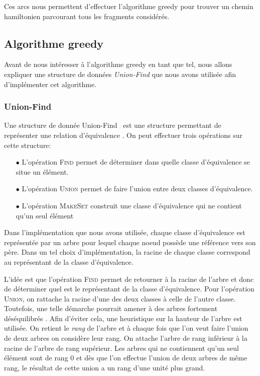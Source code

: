 Ces arcs nous permettent d'effectuer l'algorithme greedy pour trouver un chemin hamiltonien parcourant tous les fragments considérés.


\subsection{Algorithme greedy}
\label{subsection:greedy}

Avant de nous intéresser à l'algorithme greedy en tant que tel, nous allons expliquer une structure de données \emph{Union-Find} que nous avons utilisée afin d'implémenter cet algorithme.

\subsubsection{Union-Find}

Une structure de donnée \og Union-Find \fg~est une structure permettant de représenter une relation d'équivalence . On peut effectuer trois opérations sur cette structure:
\begin{itemize}
\item[$\bullet$] L'opération \textsc{Find} permet de déterminer dans quelle classe d'équivalence se situe un élément.
\item[$\bullet$] L'opération \textsc{Union} permet de faire l'union entre deux classes d'équivalence.
\item[$\bullet$] L'opération \textsc{MakeSet} construit une classe d'équivalence qui ne contient qu'un seul élément
\end{itemize}

Dans l'implémentation que nous avons utilisée, chaque classe d'équivalence est représentée par un arbre pour lequel chaque noeud possède une référence vers son père. Dans un tel choix d'implémentation, la racine de chaque classe correspond au représentant de la classe d'équivalence.

L'idée est que l'opération \textsc{Find} permet de retourner à la racine de l'arbre et donc de déterminer quel est le représentant de la classe d'équivalence. Pour l'opération \textsc{Union}, on rattache la racine d'une des deux classes à celle de l'autre classe. Toutefois, une telle démarche pourrait amener à des arbres fortement déséquilibrés . Afin d'éviter cela, une heuristique sur la hauteur de l'arbre est utilisée. On retient le \emph{rang} de l'arbre et à chaque fois que l'on veut faire l'union de deux arbres on considère leur rang. On attache l'arbre de rang inférieur à la racine de l'arbre de rang supérieur. Les arbres qui ne contiennent qu'un seul élément sont de rang 0 et dès que l'on effectue l'union de deux arbres de même rang, le résultat de cette union a un rang d'une unité plus grand.

